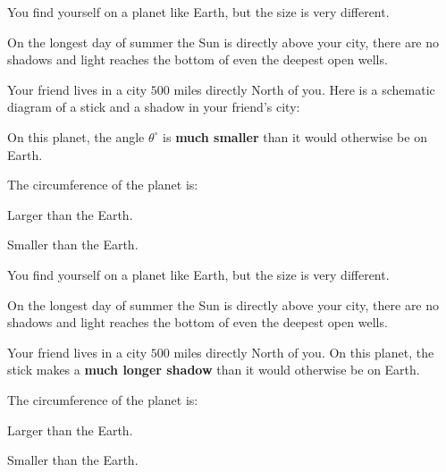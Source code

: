 \documentclass[noauthor,nooutcomes]{ximera}
\begin{document}
\begin{exercise}
 You find yourself on a planet like Earth, but the size is very different. 
 
 On the longest day of summer the Sun is directly above your city, there are no shadows and light reaches the bottom of even the deepest open wells.

Your friend lives in a city $500$ miles directly North of you. Here is a schematic diagram of a stick and a shadow in your friend's city:
  \begin{center}
    \end{center}
    On this planet, the angle $\theta^\circ$ is \textbf{much smaller}  than it would otherwise be on Earth.
     
The circumference of the planet is:
\begin{enumerate}
\begin{multicols}{2}
\item Larger than the Earth.
\item Smaller than the Earth.
\end{multicols}
 \end{enumerate}
\end{exercise}

\begin{exercise}
 You find yourself on a planet like Earth, but the size is very different. 
 
 On the longest day of summer the Sun is directly above your city, there are no shadows and light reaches the bottom of even the deepest open wells.

 Your friend lives in a city $500$ miles directly North of you. On this planet, the stick makes a \textbf{much longer shadow} than it would otherwise be on Earth.
     
The circumference of the planet is:
\begin{enumerate}
\begin{multicols}{2}
\item Larger than the Earth.
\item Smaller than the Earth.
\end{multicols}
 \end{enumerate}
\end{exercise}





\end{document}

